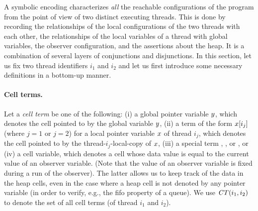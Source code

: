 A symbolic encoding characterizes {\em all} the reachable
configurations of the program from the point of view of two distinct
executing threads. %
This is done by recording the relationships of the local
configurations of the two threads with each other, the relationships
of the local variables of a thread with global variables, the observer
configuration, and the assertions about the heap.
%
It is a combination of several layers of conjunctions and
disjunctions. %
In this section, let us fix two thread identifiers $i_1$ and $i_2$ and
let us first introduce some necessary definitions in a bottom-up
manner. %

\paragraph{Cell terms.}
Let a {\em cell term} be one of the following: %
(i) a global pointer variable $y$, %
which denotes the cell pointed to by the global variable $y$, %
(ii) a term of the form $x[i_j]$ (where $j=1$ or $j=2$) for a
local pointer variable $x$ of thread $i_j$, which denotes the cell
pointed to by the thread-$i_j$-local-copy of $x$, %
(iii) a special term {\nullconst}, {\undefconst}, or {\freeconst}, %
or (iv) a cell variable, which denotes a cell whose data value is
equal to the current value of an observer variable. %
(Note that the value of an observer variable is fixed during a run of
the observer). %
The latter allows us to keep track of the data in the heap cells, even
in the case where a heap cell is not denoted by any pointer variable
(in order to verify, e.g., the {\sc fifo} property of a queue). %
We use ${\it CT}(i_1,i_2)$ to denote the set of all cell terms (of
thread $i_1$ and $i_2$). %

